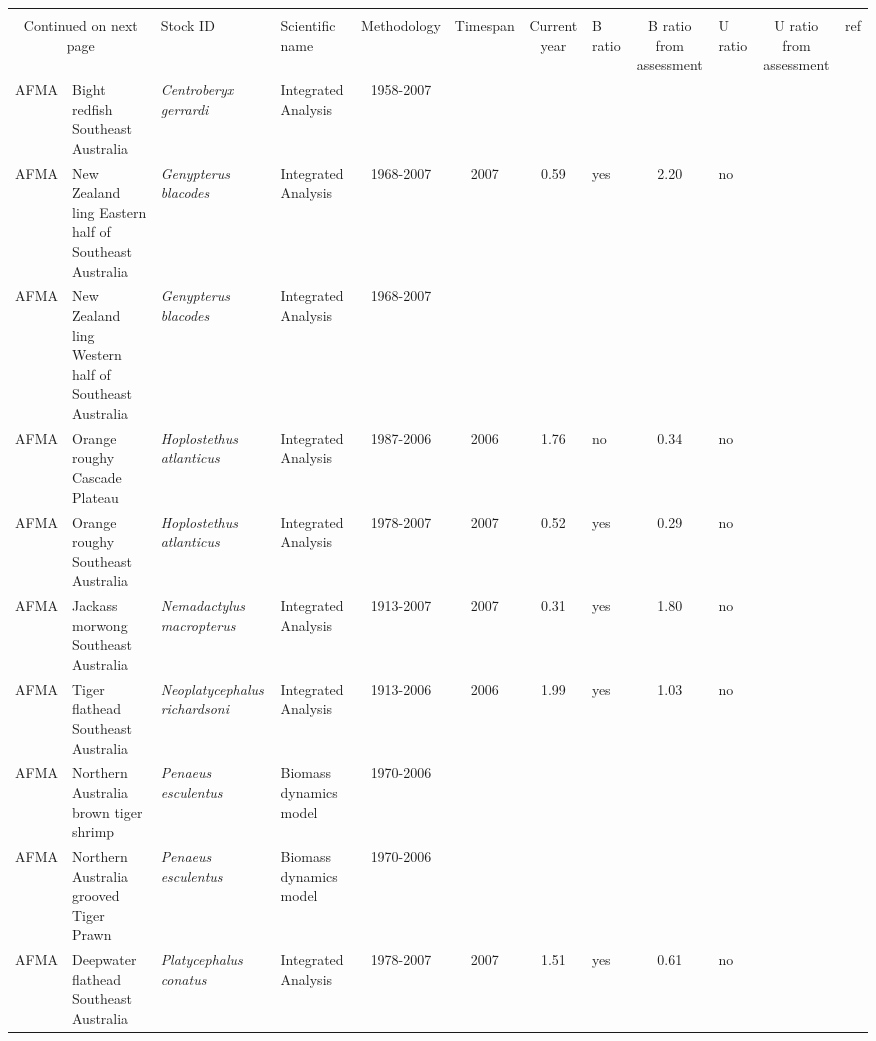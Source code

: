 \begin{longtable}{p{1.8cm}p{3.5cm}p{3.5cm}p{3cm}cccp{0.9cm}cp{0.9cm}c}
  \bottomrule \\ \multicolumn{2}{c}{Continued on next page} \endfoot \endlastfoot
Management & Stock ID & Scientific name & Methodology & Timespan & Current year & B ratio & B ratio from assessment & U ratio & U ratio from assessment & ref \\ \midrule \endhead
AFMA & Bight redfish Southeast Australia & \textit{Centroberyx gerrardi} & Integrated Analysis & 1958-2007 &  &  &  &  &  & \cite{BIGHTREDDEEPFLATSE.pdf} \\ 
  AFMA & New Zealand ling Eastern half of Southeast Australia & \textit{Genypterus blacodes} & Integrated Analysis & 1968-2007 & 2007 & 0.59 & yes & 2.20 & no & \cite{NZLINGSE.pdf} \\ 
  AFMA & New Zealand ling Western half of Southeast Australia & \textit{Genypterus blacodes} & Integrated Analysis & 1968-2007 &  &  &  &  &  & \cite{NZLINGSE.pdf} \\ 
  AFMA & Orange roughy Cascade Plateau & \textit{Hoplostethus atlanticus} & Integrated Analysis & 1987-2006 & 2006 & 1.76 & no & 0.34 & no & \cite{CSIRO-Cascade-Plateau-Stock-Assessment-2006.pdf} \\ 
  AFMA & Orange roughy Southeast Australia & \textit{Hoplostethus atlanticus} & Integrated Analysis & 1978-2007 & 2007 & 0.52 & yes & 0.29 & no & \cite{OROUGHYSE.pdf} \\ 
  AFMA & Jackass morwong Southeast Australia & \textit{Nemadactylus macropterus} & Integrated Analysis & 1913-2007 & 2007 & 0.31 & yes & 1.80 & no & \cite{MORWONGSE.pdf} \\ 
  AFMA & Tiger flathead Southeast Australia & \textit{Neoplatycephalus richardsoni} & Integrated Analysis & 1913-2006 & 2006 & 1.99 & yes & 1.03 & no & \cite{TIGERFLATSE.pdf} \\ 
  AFMA & Northern Australia brown tiger shrimp & \textit{Penaeus esculentus} & Biomass dynamics model & 1970-2006 &  &  &  &  &  & \cite{NORTHPRAWNS.pdf} \\ 
  AFMA & Northern Australia grooved Tiger Prawn & \textit{Penaeus esculentus} & Biomass dynamics model & 1970-2006 &  &  &  &  &  & \cite{NORTHPRAWNS.pdf} \\ 
  AFMA & Deepwater flathead Southeast Australia & \textit{Platycephalus conatus} & Integrated Analysis & 1978-2007 & 2007 & 1.51 & yes & 0.61 & no & \cite{BIGHTREDDEEPFLATSE.pdf} \\ 

\end{longtable}
